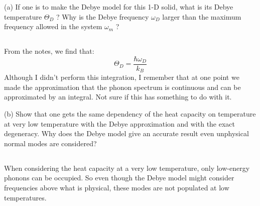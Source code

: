 \documentclass[12pt]{article}
\begin{document}
(a) If one is to make the Debye model for this 1-D solid, what is its Debye temperature $\Theta_{D}$ ? Why is the Debye frequency $\omega_{D}$ larger than the maximum frequency allowed in the system $\omega_{m}$ ?
\subsection{}
From the notes, we find that:
\begin{equation}
  \Theta_{D} = \frac{\hbar \omega_{D}}{k_B}
\end{equation}
Although I didn't perform this integration, I remember that at one point we made the approximation that the phonon spectrum is continuous and can be approximated by an integral. Not sure if this has something to do with it.

(b) Show that one gets the same dependency of the heat capacity on temperature at very low temperature with the Debye approximation and with the exact degeneracy. Why does the Debye model give an accurate result even  unphysical normal modes are considered?
\subsection{}
When considering the heat capacity at a very low temperature, only low-energy phonons can be occupied. So even though the Debye model might consider frequencies above what is physical, these modes are not populated at low temperatures.
\end{document}
